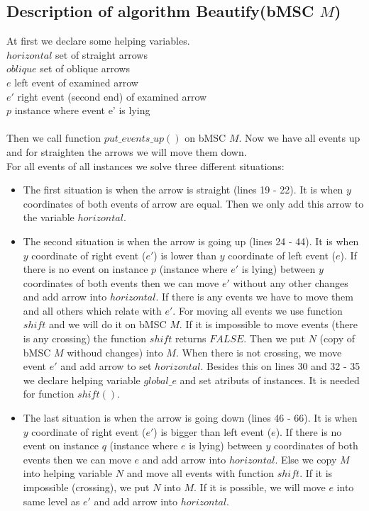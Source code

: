 \documentclass{article}
\begin{document}
\subsection*{Description of algorithm Beautify(bMSC $M$)}
At first we declare some helping variables.\\
	$horizontal$		 set of straight arrows \\
	$oblique$ set of oblique arrows \\
	$e$			left event of examined arrow \\
	$e'$		right event (second end) of examined arrow \\
	$p$			instance where event e' is lying \\
\\
Then we call function $put\_events\_up()$ on bMSC $M$. Now we have all events up and for straighten the arrows we will move them down. \\
For all events of all instances we solve three different situations: \\
\begin{itemize}
\item The first situation is when the arrow is straight (lines 19 - 22). It is when $y$ coordinates of both events of arrow are equal. Then we only add this arrow to the variable $horizontal$. \\
\item The second situation is when the arrow is going up (lines 24 - 44). It is when $y$ coordinate of right event ($e'$) is lower than $y$ coordinate of left event ($e$). If there is no event on instance $p$ (instance where $e'$ is lying) between $y$ coordinates of both events then we can move $e'$ without any other changes and add arrow into $horizontal$. If there is any events we have to move them and all others which relate with $e'$. For moving all events we use function $shift$ and we will do it on bMSC $M$. If it is impossible to move events (there is any crossing) the function $shift$ returns $FALSE$. Then we put $N$ (copy of bMSC $M$ withoud changes) into $M$. When there is not crossing, we move event $e'$ and add arrow to set $horizontal$. Besides this on lines 30 and 32 - 35 we declare helping variable $global\_e$ and set atributs of instances. It is needed for function $shift()$.
\item The last situation is when the arrow is going down (lines 46 - 66). It is when $y$ coordinate of right event ($e'$) is bigger than left event ($e$). If there is no event on instance $q$ (instance where $e$ is lying) between $y$ coordinates of both events then we can move $e$ and add arrow into $horizontal$. Else we copy $M$ into helping variable $N$ and move all events with function $shift$. If it is impossible (crossing), we put $N$ into $M$. If it is possible, we will move $e$ into same level as $e'$ and add arrow into $horizontal$.  
\end{itemize}
   
\end{document}
